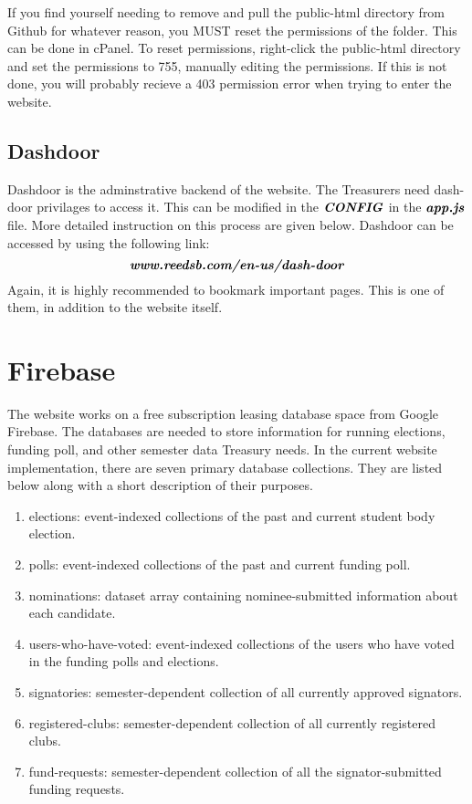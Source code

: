 \documentclass[a4paper]{article}
\begin{document}
\begin{warning*}
If you find yourself needing to remove and pull the public-html directory from Github for whatever reason, you MUST reset the permissions of the folder. This can be done in cPanel. To reset permissions, right-click the public-html directory and set the permissions to 755, manually editing the permissions. If this is not done, you will probably recieve a 403 permission error when trying to enter the website.
\end{warning*}

\subsection{Dashdoor}
Dashdoor is the adminstrative backend of the website. The Treasurers need dash-door privilages to access it. This can be modified in the $\textbf{\textit{CONFIG}}$ in the $\textbf{\textit{app.js}}$ file. More detailed instruction on this process are given below. Dashdoor can be accessed by using the following link:
$$\textbf{\textit{www.reedsb.com/en-us/dash-door}}$$
Again, it is highly recommended to bookmark important pages. This is one of them, in addition to the website itself.


\newpage
\section{Firebase}

The website works on a free subscription leasing database space from Google Firebase. The databases are needed to store information for
running elections, funding poll, and other semester data Treasury needs. In the current website implementation, there are seven primary database collections. They are listed below along with a short description of their purposes.

\begin{enumerate}
  \item elections: event-indexed collections of the past and current student body election.
  \item polls: event-indexed collections of the past and current funding poll.
  \item nominations: dataset array containing nominee-submitted information about each candidate.
  \item users-who-have-voted: event-indexed collections of the users who have voted in the funding polls and elections.
  \item signatories: semester-dependent collection of all currently approved signators.
  \item registered-clubs: semester-dependent collection of all currently registered clubs.
  \item fund-requests: semester-dependent collection of all the signator-submitted funding requests.
\end{enumerate}
\end{document}
